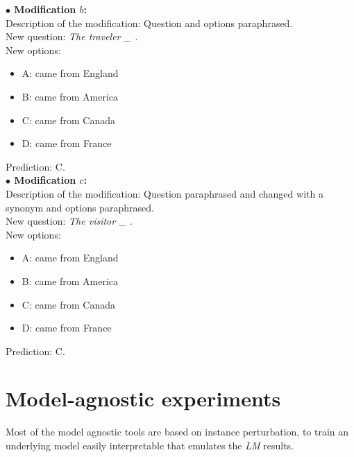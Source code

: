 \textbf{$\bullet$ Modification $b$:} \\
Description of the modification: Question and options paraphrased.\\
New question: \emph{The traveler \_ .} \\
New options:
\begin{itemize}
 \item A: came from England
 \item B: came from America
 \item C: came from Canada
 \item D: came from France
\end{itemize}
Prediction: C. \\
\textbf{$\bullet$ Modification $c$:} \\
Description of the modification: Question paraphrased and changed with a synonym and options paraphrased.\\
New question: \emph{The visitor \_ .} \\
New options:
\begin{itemize}
 \item A: came from England
 \item B: came from America
 \item C: came from Canada
 \item D: came from France
\end{itemize}
Prediction: C.
\section{Model-agnostic experiments}
\label{sec:ModelAgnosticExperiments}
\noindent Most of the model agnostic tools are based on instance perturbation, to train an underlying model easily interpretable that emulates the \emph{LM} results.
